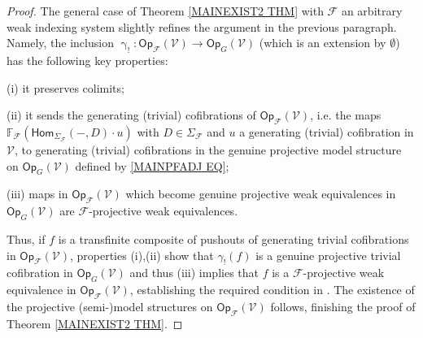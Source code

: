 \documentclass[a4paper,10pt
,draft
]{article}%
\numberwithin{equation}{section}
\numberwithin{figure}{section}
\theoremstyle{definition} %
\newcommand{\1}{\ensuremath{\mathbbm 1}}%
\begin{document}
\begin{proof}
  

The general case of Theorem \ref{MAINEXIST2 THM}
with $\mathcal{F}$ an arbitrary weak indexing system
slightly refines the argument in the previous paragraph.
Namely, the inclusion
$\upgamma_! \colon 
\mathsf{Op}_{\mathcal{F}}(\mathcal{V})
\to
\mathsf{Op}_{G}(\mathcal{V})$
(which is an extension by $\emptyset$)
has the following key properties:
\begin{inparaenum}
	\item[(i)] it preserves colimits;
	\item[(ii)] it sends the generating (trivial) cofibrations
	of $\mathsf{Op}_{\mathcal{F}}(\mathcal{V})$,
	i.e. the maps
	$\mathbb{F}_{\mathcal{F}}
	\left(
	\mathsf{Hom}_{\Sigma_{\mathcal{F}}}(-,D) \cdot u
	\right)$
	with $D \in \Sigma_{\mathcal{F}}$
	and $u$ a generating (trivial) cofibration in $\mathcal{V}$,
	to generating (trivial) cofibrations
	in the genuine projective model structure
	on $\mathsf{Op}_G(\mathcal{V})$
	defined by \eqref{MAINPFADJ EQ};
	\item[(iii)] maps in $\mathsf{Op}_{\mathcal{F}}(\mathcal{V})$ which become genuine projective 
	weak equivalences in $\mathsf{Op}_{G}(\mathcal{V})$
	are $\mathcal{F}$-projective weak equivalences.
\end{inparaenum}
	Thus, if $f$ is a transfinite 
	composite of pushouts of generating trivial cofibrations
	in $\mathsf{Op}_{\mathcal{F}}(\mathcal{V})$,
	properties (i),(ii) show that 
	$\gamma_!(f)$
	is a genuine projective trivial cofibration in 
	$\mathsf{Op}_{G}(\mathcal{V})$
	and thus (iii) implies
	that $f$ is a $\mathcal{F}$-projective weak equivalence in
	$\mathsf{Op}_{\mathcal{F}}(\mathcal{V})$,
	establishing the required condition in 
	\cite[Thm. 11.3.2(2)]{Hi03}.
%
	The existence of the projective (semi-)model structures on $\mathsf{Op}_{\mathcal{F}}(\mathcal{V})$ follows,
	finishing the proof of Theorem \ref{MAINEXIST2 THM}.


\end{proof}
\end{document}
